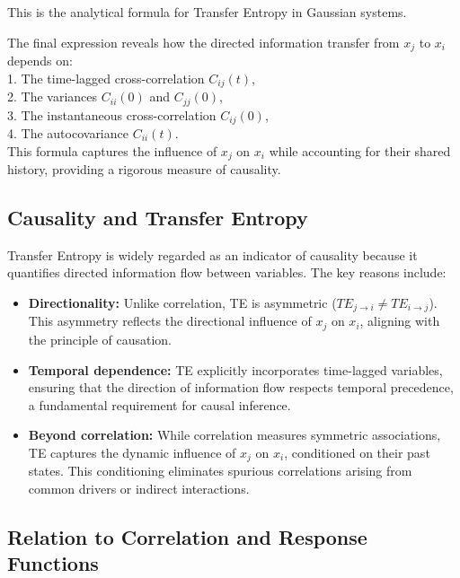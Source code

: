 \documentclass[English, Lau, oneside]{sapthesis}
\begin{document}
This is the analytical formula for Transfer Entropy in Gaussian systems.

The final expression reveals how the directed information transfer from \(x_j\) to \(x_i\) depends on:\\
1. The time-lagged cross-correlation \(C_{ij}(t)\),\\
2. The variances \(C_{ii}(0)\) and \(C_{jj}(0)\),\\
3. The instantaneous cross-correlation \(C_{ij}(0)\),\\
4. The autocovariance \(C_{ii}(t)\).\\

This formula captures the influence of \(x_j\) on \(x_i\) while accounting for their shared history, providing a rigorous measure of causality.

\subsection*{Causality and Transfer Entropy}

\noindent Transfer Entropy is widely regarded as an indicator of causality because it quantifies directed information flow between variables. The key reasons include:

\begin{itemize}
    \item \textbf{Directionality:} Unlike correlation, TE is asymmetric (\(TE_{j \to i} \neq TE_{i \to j}\)). This asymmetry reflects the directional influence of \(x_j\) on \(x_i\), aligning with the principle of causation.
    \item \textbf{Temporal dependence:} TE explicitly incorporates time-lagged variables, ensuring that the direction of information flow respects temporal precedence, a fundamental requirement for causal inference.
    \item \textbf{Beyond correlation:} While correlation measures symmetric associations, TE captures the dynamic influence of \(x_j\) on \(x_i\), conditioned on their past states. This conditioning eliminates spurious correlations arising from common drivers or indirect interactions.
\end{itemize}

\subsection*{Relation to Correlation and Response Functions}
\end{document}
